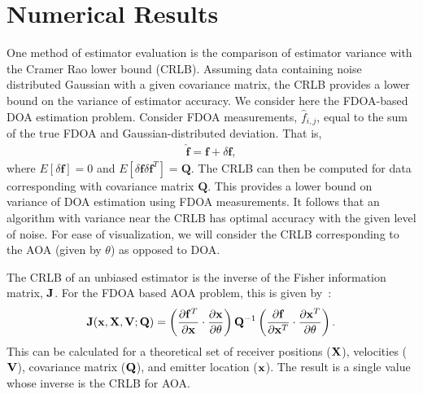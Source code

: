 \section{Numerical Results}
\label{s:numerics}

One method of estimator evaluation is the comparison of estimator variance with the Cramer Rao lower bound (CRLB). Assuming data containing noise distributed Gaussian with a given covariance matrix, the CRLB provides a lower bound on the variance of estimator accuracy. We consider here the FDOA-based DOA estimation problem. Consider FDOA measurements, $\hat{f}_{i,j}$, equal to the sum of the true FDOA and Gaussian-distributed deviation. That is,
\begin{align*}
\hat{\mathbf{f}} = \mathbf{f} + \delta \mathbf{f},
\end{align*}
where $E\left[\delta \mathbf{f}\right]=0$ and $E\left[\delta\mathbf{f}\delta\mathbf{f}^T\right]=\mathbf{Q}$. The CRLB can then be computed for data corresponding with covariance matrix $\mathbf{Q}$. This provides a lower bound on variance of DOA estimation using FDOA measurements. It follows that an algorithm with variance near the CRLB has optimal accuracy with the given level of noise. For ease of visualization, we will consider the CRLB corresponding to the AOA (given by $\theta$) as opposed to DOA.

The CRLB of an unbiased estimator is the inverse of the Fisher information matrix, $\mathbf{J}$. For the FDOA based AOA problem, this is given by~\cite{Ho1997}:
\begin{align*}
\mathbf{J}(\mathbf{x},\mathbf{X},\mathbf{V}; \mathbf{Q}) = \left(\frac{\partial\mathbf{f}^{T}}{\partial\mathbf{x}}\cdot\frac{\partial\mathbf{x}}{\partial\theta}\right)\mathbf{Q}^{-1}\left(\frac{\partial \mathbf{f}}{\partial\mathbf{x}^T}\cdot\frac{\partial\mathbf{x}^T}{\partial\theta}\right).
\end{align*}
 This can be calculated for a theoretical set of receiver positions ($\mathbf{X}$), velocities ($\mathbf{V}$), covariance matrix ($\mathbf{Q}$), and emitter location ($\mathbf{x}$). The result is a single value whose inverse is the CRLB for AOA.

